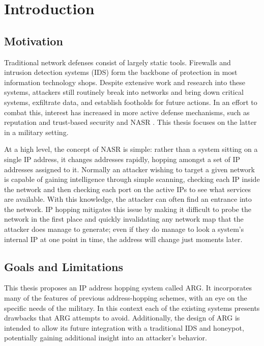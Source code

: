 \chapter{Introduction}
\label{chp:introduction}

\section{Motivation}
\par Traditional network defenses consist of largely static tools. Firewalls and intrusion detection systems (IDS) form the backbone of protection in most information technology shops. Despite extensive work and research into these systems, attackers still routinely break into networks and bring down critical systems, exfiltrate data, and establish footholds for future actions. In an effort to combat this, interest has increased in more active defense mechanisms, such as reputation and trust-based security \cite{Untrustworthiness} and \ac{NASR} \cite{APOD, NAH}. This thesis focuses on the latter in a military setting.

\par At a high level, the concept of \ac{NASR} is simple: rather than a system sitting on a single \ac{IP} address, it changes addresses rapidly, hopping amongst a set of \ac{IP} addresses assigned to it. Normally an attacker wishing to target a given network is capable of gaining intelligence through simple scanning, checking each IP inside the network and then checking each port on the active IPs to see what services are available. With this knowledge, the attacker can often find an entrance into the network. IP hopping mitigates this issue by making it difficult to probe the network in the first place and quickly invalidating any network map that the attacker does manage to generate; even if they do manage to look a system's internal IP at one point in time, the address will change just moments later.

\section{Goals and Limitations}
\par This thesis proposes an IP address hopping system called \ac{ARG}. It incorporates many of the features of previous address-hopping schemes, with an eye on the specific needs of the military. In this context each of the existing systems presents drawbacks that \ac{ARG} attempts to avoid. Additionally, the design of ARG is intended to allow its future integration with a traditional IDS and honeypot, potentially gaining additional insight into an attacker's behavior.

